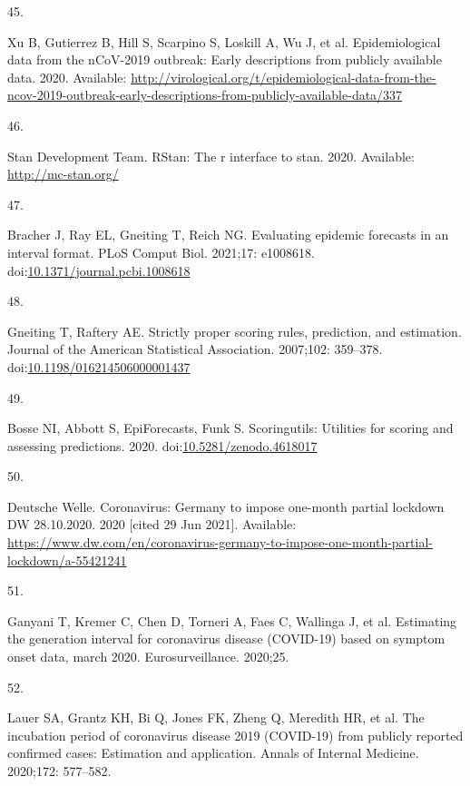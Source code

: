 \documentclass[10pt,letterpaper]{article}
\newlength{\cslhangindent}
\newlength{\csllabelwidth}
\newlength{\cslentryspacingunit} %
\newenvironment{CSLReferences}[2] %
 {%
  \setlength{\parindent}{0pt}
  \ifodd #1
  \let\oldpar\par
  \def\par{\hangindent=\cslhangindent\oldpar}
  \fi
  \setlength{\parskip}{#2\cslentryspacingunit}
 }%
 {}
\newcommand{\CSLLeftMargin}[1]{\parbox[t]{\csllabelwidth}{#1}}
\newcommand{\CSLRightInline}[1]{\parbox[t]{\linewidth - \csllabelwidth}{#1}\break}
\begin{document}
\begin{CSLReferences}{0}{0}
\leavevmode{}%
\CSLLeftMargin{45. }
\CSLRightInline{Xu B, Gutierrez B, Hill S, Scarpino S, Loskill A, Wu J,
et al. Epidemiological data from the nCoV-2019 outbreak: Early
descriptions from publicly available data. 2020. Available:
\url{http://virological.org/t/epidemiological-data-from-the-ncov-2019-outbreak-early-descriptions-from-publicly-available-data/337}}

\leavevmode{}%
\CSLLeftMargin{46. }
\CSLRightInline{Stan Development Team. RStan: The r interface to stan.
2020. Available: \url{http://mc-stan.org/}}

\leavevmode{}%
\CSLLeftMargin{47. }
\CSLRightInline{Bracher J, Ray EL, Gneiting T, Reich NG. Evaluating
epidemic forecasts in an interval format. PLoS Comput Biol. 2021;17:
e1008618.
doi:\href{https://doi.org/10.1371/journal.pcbi.1008618}{10.1371/journal.pcbi.1008618}}

\leavevmode{}%
\CSLLeftMargin{48. }
\CSLRightInline{Gneiting T, Raftery AE. Strictly proper scoring rules,
prediction, and estimation. Journal of the American Statistical
Association. 2007;102: 359--378.
doi:\href{https://doi.org/10.1198/016214506000001437}{10.1198/016214506000001437}}

\leavevmode{}%
\CSLLeftMargin{49. }
\CSLRightInline{Bosse NI, Abbott S, EpiForecasts, Funk S. Scoringutils:
Utilities for scoring and assessing predictions. 2020.
doi:\href{https://doi.org/10.5281/zenodo.4618017}{10.5281/zenodo.4618017}}

\leavevmode{}%
\CSLLeftMargin{50. }
\CSLRightInline{Deutsche Welle. Coronavirus: {Germany} to impose
one-month partial lockdown \textbar{} {DW} \textbar{} 28.10.2020. 2020
{[}cited 29 Jun 2021{]}. Available:
\url{https://www.dw.com/en/coronavirus-germany-to-impose-one-month-partial-lockdown/a-55421241}}

\leavevmode{}%
\CSLLeftMargin{51. }
\CSLRightInline{Ganyani T, Kremer C, Chen D, Torneri A, Faes C, Wallinga
J, et al. Estimating the generation interval for coronavirus disease
(COVID-19) based on symptom onset data, march 2020. Eurosurveillance.
2020;25. }

\leavevmode{}%
\CSLLeftMargin{52. }
\CSLRightInline{Lauer SA, Grantz KH, Bi Q, Jones FK, Zheng Q, Meredith
HR, et al. The incubation period of coronavirus disease 2019 (COVID-19)
from publicly reported confirmed cases: Estimation and application.
Annals of Internal Medicine. 2020;172: 577--582. }


\end{CSLReferences}
\end{document}
